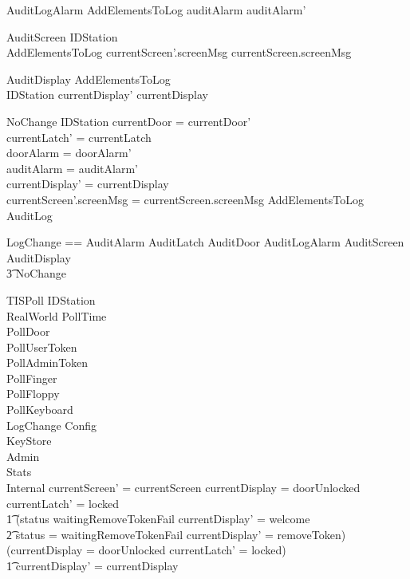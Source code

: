 \begin{schema}{AuditLogAlarm}
        AddElementsToLog
\where
        auditAlarm \neq auditAlarm'
\end{schema}

\begin{schema}{AuditScreen}
        \Delta IDStation 
\\      AddElementsToLog
\where
        currentScreen'.screenMsg \neq currentScreen.screenMsg 
\end{schema}

\begin{schema}{AuditDisplay}
        AddElementsToLog
\\      \Delta IDStation 
\where
        currentDisplay' \neq currentDisplay
\end{schema}

\begin{schema}{NoChange}
      \Delta IDStation
\where
        currentDoor = currentDoor'
\\      currentLatch' = currentLatch 
\\      doorAlarm = doorAlarm' 
\\      auditAlarm = auditAlarm'
\\      currentDisplay' = currentDisplay
\\      currentScreen'.screenMsg = currentScreen.screenMsg 
\also
        AddElementsToLog \lor \Xi AuditLog
\end{schema}

\begin{zed}
        LogChange == AuditAlarm \lor AuditLatch \lor AuditDoor
        \lor AuditLogAlarm \lor AuditScreen \lor AuditDisplay 
\\ \t3 \lor NoChange
\end{zed}

\begin{schema}{TISPoll}
	\Delta IDStation
\\      \Xi RealWorld
\also
	PollTime
\\      PollDoor
\\	PollUserToken
\\	PollAdminToken
\\	PollFinger
\\      PollFloppy
\\      PollKeyboard
\\      LogChange
\also
        \Xi Config
\\      \Xi KeyStore
\\      \Xi Admin
\\      \Xi Stats
\\      \Xi Internal
\where
        currentScreen' = currentScreen
\also
        currentDisplay = doorUnlocked \land
        currentLatch' = locked
\\ \t1 \land        (status \neq waitingRemoveTokenFail \land
        currentDisplay' = welcome
\\ \t2 \lor status = waitingRemoveTokenFail \land currentDisplay' =
removeToken)
\\      \lor
        \lnot (currentDisplay = doorUnlocked \land currentLatch' =
        locked)
\\ \t1  \land currentDisplay' = currentDisplay
\end{schema}

